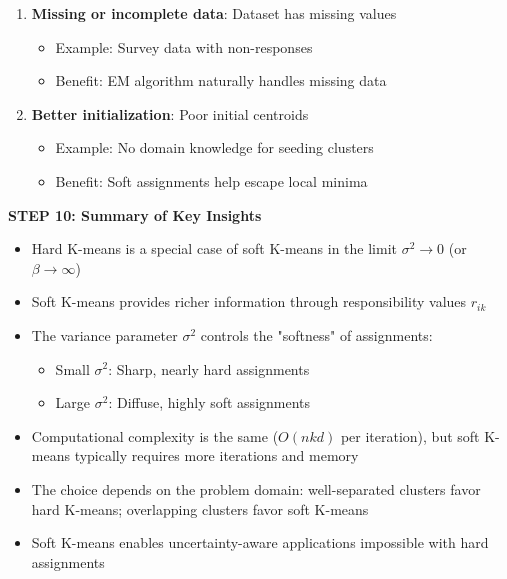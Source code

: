 \documentclass[12pt]{article}
\begin{document}
\begin{solution}
\begin{enumerate}
    \item \textbf{Missing or incomplete data}: Dataset has missing values
    \begin{itemize}
        \item Example: Survey data with non-responses
        \item Benefit: EM algorithm naturally handles missing data
    \end{itemize}

    \item \textbf{Better initialization}: Poor initial centroids
    \begin{itemize}
        \item Example: No domain knowledge for seeding clusters
        \item Benefit: Soft assignments help escape local minima
    \end{itemize}
\end{enumerate}

\textbf{STEP 10: Summary of Key Insights}

\begin{itemize}
    \item Hard K-means is a special case of soft K-means in the limit $\sigma^2 \to 0$ (or $\beta \to \infty$)

    \item Soft K-means provides richer information through responsibility values $r_{ik}$

    \item The variance parameter $\sigma^2$ controls the "softness" of assignments:
    \begin{itemize}
        \item Small $\sigma^2$: Sharp, nearly hard assignments
        \item Large $\sigma^2$: Diffuse, highly soft assignments
    \end{itemize}

    \item Computational complexity is the same ($O(nkd)$ per iteration), but soft K-means typically requires more iterations and memory

    \item The choice depends on the problem domain: well-separated clusters favor hard K-means; overlapping clusters favor soft K-means

    \item Soft K-means enables uncertainty-aware applications impossible with hard assignments
\end{itemize}

\end{solution}
\end{document}
